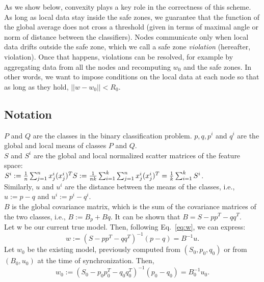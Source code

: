 \par As we show below, convexity
plays a key role in the correctness of this scheme. As long
as local data stay inside the safe zones, we guarantee that
the function of the global average does not cross a threshold (given
in terms of maximal angle or norm of distance between the classifiers).
Nodes communicate only when local data drifts outside the
safe zone, which we call a safe zone \textit{violation} (hereafter,
violation). Once that happens, violations can be resolved,
for example by aggregating data from all the nodes and recomputing $w_0$
and the safe zones.
In other words, we want to impose conditions on the local
data at each node so that as long as they hold, $||w-w_0||<R_0$.

\subsection{Notation}
\noindent
$P$ and $Q$ are the classes in the binary classification problem.
 $p,q,p^i$ and $q^i$  are the global and local means of classes $P$ and $Q$.
\\$S$ and $S^i$  are the global and local normalized scatter matrices of the feature space:
\\$S^i := \frac{1}{n}\sum_{j=1}^{n}x^i_j(x^i_j)^T
\\S := \frac{1}{nk}
\sum_{i=1}^k\sum_{j=1}^nx^i_j(x^i_j)^T=\frac{1}{k}\sum_{i=1}^kS^i$.
\\Similarly, $u$ and $u^i$ are the distance between the means of the classes, i.e., $u:=p - q$ and $u^i:=p^i - q^i$.
\\ $B$ is the global covariance matrix, which is the sum of the covariance matrices of the two classes, i.e., $B:=B_p+Bq$.
It can be shown that $B=S - pp^T - qq^T$.
\\Let w be our current true model. Then, following Eq.~\ref{eq:w}, we can express:
\begin{equation}
w:=(S - pp^T - qq^T)^{-1}(p-q)=B^{-1}u.
\end{equation}
Let $w_0$ be the existing model, previously computed from $(S_0, p_0, q_0)$
or from $(B_0,u_0)$ at the time of synchronization.
Then,
\begin{equation}
w_0:=(S_0 - p_0p_0^T - q_0q_0^T)^{-1}(p_0-q_0)=B_0^{-1}u_0.
\end{equation}
